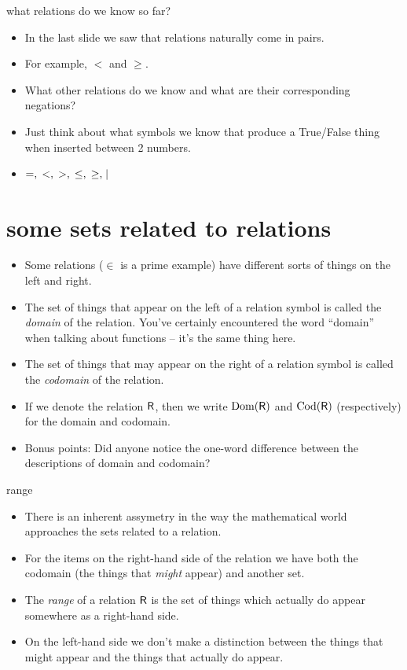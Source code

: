 \documentclass[landscape]{beamer}
\begin{document}
\begin{frame}{what relations do we know so far?}
\begin{itemize}
\item In the last slide we saw that relations naturally come in pairs. \pause
\item For example, $<$ and $\geq$. \pause
\item What other relations do we know and what are their corresponding negations? \pause
\item Just think about what symbols we know that produce a True/False thing when inserted between 2 numbers.\pause
\item $=, \; <, \; >, \; \leq, \; \geq, \; \!\mid\! $
\end{itemize}
\end{frame}

\section{some sets related to relations}
\begin{frame}{}
\begin{itemize}
\item Some relations ($\in$ is a prime example) have different sorts of things on the left and right. \pause
\item The set of things that appear on the left of a relation symbol is called the {\em domain} of the relation. \pause You've certainly encountered the word ``domain'' when talking about functions -- it's the same thing here. \pause
\item The set of things that may appear on the right of a relation symbol is called the {\em codomain} of the relation. \pause
\item If we denote the relation $\mbox{\textsf R}$, then we write $\mbox{Dom}(\mbox{\textsf R})$ and $\mbox{Cod}(\mbox{\textsf R})$ (respectively) for the domain and codomain. \pause
\item Bonus points: Did anyone notice the one-word difference between the descriptions of domain and codomain?
\end{itemize}
\end{frame}

\begin{frame}{range}
\begin{itemize}
\item There is an inherent assymetry in the way the mathematical world approaches the sets related to a relation. \pause
\item For the items on the right-hand side of the relation we have both the codomain (the things that {\em might} appear) and another set. \pause
\item The {\em range} of a relation $\mbox{\textsf R}$ is the set of things which actually do appear somewhere as a right-hand side. \pause
\item On the left-hand side we don't make a distinction between the things that might appear and the things that actually do appear. 
\end{itemize}
\end{frame}
\end{document}
